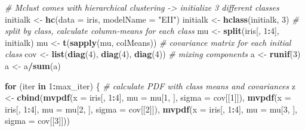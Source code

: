 \documentclass[12pt]{article}
\newenvironment{Shaded}{\begin{snugshade}}{\end{snugshade}}
\newcommand{\AttributeTok}[1]{\textcolor[rgb]{0.13,0.29,0.53}{#1}}
\newcommand{\CommentTok}[1]{\textcolor[rgb]{0.56,0.35,0.01}{\textit{#1}}}
\newcommand{\ControlFlowTok}[1]{\textcolor[rgb]{0.13,0.29,0.53}{\textbf{#1}}}
\newcommand{\DecValTok}[1]{\textcolor[rgb]{0.00,0.00,0.81}{#1}}
\newcommand{\FunctionTok}[1]{\textcolor[rgb]{0.13,0.29,0.53}{\textbf{#1}}}
\newcommand{\NormalTok}[1]{#1}
\newcommand{\OtherTok}[1]{\textcolor[rgb]{0.56,0.35,0.01}{#1}}
\newcommand{\SpecialCharTok}[1]{\textcolor[rgb]{0.81,0.36,0.00}{\textbf{#1}}}
\newcommand{\StringTok}[1]{\textcolor[rgb]{0.31,0.60,0.02}{#1}}
\begin{document}
\begin{Shaded}
\begin{Highlighting}[]
\CommentTok{\# Mclust comes with hierarchical clustering {-}\textgreater{} initialize 3 different classes}
\NormalTok{initialk }\OtherTok{\textless{}{-}} \FunctionTok{hc}\NormalTok{(}\AttributeTok{data =}\NormalTok{ iris, }\AttributeTok{modelName =} \StringTok{"EII"}\NormalTok{)}
\NormalTok{initialk }\OtherTok{\textless{}{-}} \FunctionTok{hclass}\NormalTok{(initialk, }\DecValTok{3}\NormalTok{)}
\CommentTok{\# split by class, calculate column{-}means for each class}
\NormalTok{mu }\OtherTok{\textless{}{-}} \FunctionTok{split}\NormalTok{(iris[, }\DecValTok{1}\SpecialCharTok{:}\DecValTok{4}\NormalTok{], initialk)}
\NormalTok{mu }\OtherTok{\textless{}{-}} \FunctionTok{t}\NormalTok{(}\FunctionTok{sapply}\NormalTok{(mu, colMeans))}
\CommentTok{\# covariance matrix for each initial class}
\NormalTok{cov }\OtherTok{\textless{}{-}} \FunctionTok{list}\NormalTok{(}\FunctionTok{diag}\NormalTok{(}\DecValTok{4}\NormalTok{), }\FunctionTok{diag}\NormalTok{(}\DecValTok{4}\NormalTok{), }\FunctionTok{diag}\NormalTok{(}\DecValTok{4}\NormalTok{))}
\CommentTok{\# mixing components}
\NormalTok{a }\OtherTok{\textless{}{-}} \FunctionTok{runif}\NormalTok{(}\DecValTok{3}\NormalTok{)}
\NormalTok{a }\OtherTok{\textless{}{-}}\NormalTok{ a}\SpecialCharTok{/}\FunctionTok{sum}\NormalTok{(a)}

\ControlFlowTok{for}\NormalTok{ (iter }\ControlFlowTok{in} \DecValTok{1}\SpecialCharTok{:}\NormalTok{max\_iter) \{}
\CommentTok{\# calculate PDF with class means and covariances}
\NormalTok{z }\OtherTok{\textless{}{-}} \FunctionTok{cbind}\NormalTok{(}\FunctionTok{mvpdf}\NormalTok{(}\AttributeTok{x =}\NormalTok{ iris[, }\DecValTok{1}\SpecialCharTok{:}\DecValTok{4}\NormalTok{], }\AttributeTok{mu =}\NormalTok{ mu[}\DecValTok{1}\NormalTok{, ], }\AttributeTok{sigma =}\NormalTok{ cov[[}\DecValTok{1}\NormalTok{]]), }\FunctionTok{mvpdf}\NormalTok{(}\AttributeTok{x =}\NormalTok{ iris[, }
    \DecValTok{1}\SpecialCharTok{:}\DecValTok{4}\NormalTok{], }\AttributeTok{mu =}\NormalTok{ mu[}\DecValTok{2}\NormalTok{, ], }\AttributeTok{sigma =}\NormalTok{ cov[[}\DecValTok{2}\NormalTok{]]), }\FunctionTok{mvpdf}\NormalTok{(}\AttributeTok{x =}\NormalTok{ iris[, }\DecValTok{1}\SpecialCharTok{:}\DecValTok{4}\NormalTok{], }\AttributeTok{mu =}\NormalTok{ mu[}\DecValTok{3}\NormalTok{, }
\NormalTok{    ], }\AttributeTok{sigma =}\NormalTok{ cov[[}\DecValTok{3}\NormalTok{]]))}


\end{Highlighting}
\end{Shaded}
\end{document}
